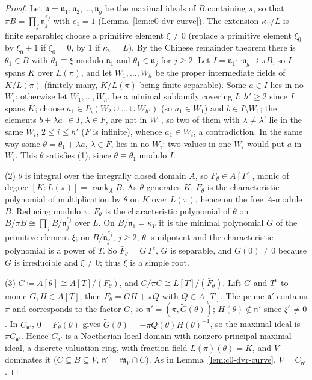 \begin{proof}
Let $\mathfrak n=\mathfrak n_1,\mathfrak n_2,\dots,\mathfrak n_g$ be the maximal ideals of $B$ containing $\pi$, so that $\pi B=\prod_j\mathfrak n_j^{e_j}$ with $e_1=1$
(Lemma~\ref{lem:c0-dvr-curve}). The extension $\kappa_V/L$ is finite separable; choose a primitive element $\xi\ne0$ (replace a
primitive element $\xi_0$ by $\xi_0+1$ if $\xi_0=0$, by $1$ if $\kappa_V=L$). By the Chinese remainder theorem there is $\theta_1\in B$ with
$\theta_1\equiv\xi$ modulo $\mathfrak n_1$ and $\theta_1\in\mathfrak n_j$ for $j\ge2$. Let $I=\mathfrak n_1\cdots\mathfrak n_g\supseteq\pi B$, so $I$ spans $K$ over $L(\pi)$,
and let $W_1,\dots,W_h$ be the proper intermediate fields of $K/L(\pi)$ (finitely many, $K/L(\pi)$ being finite separable).
Some $a\in I$ lies in no $W_i$: otherwise let $W_1,\dots,W_{h'}$ be a minimal subfamily covering $I$; $h'\ge2$ since $I$ spans
$K$; choose $a_1\in I\setminus(W_2\cup\dots\cup W_{h'})$ (so $a_1\in W_1$) and $b\in I\setminus W_1$; the elements $b+\lambda a_1\in I$, $\lambda\in F$, are not
in $W_1$, so two of them with $\lambda\ne\lambda'$ lie in the same $W_i$, $2\le i\le h'$ ($F$ is infinite), whence $a_1\in W_i$, a contradiction. In the same way some $\theta=\theta_1+\lambda a$, $\lambda\in F$, lies in no $W_i$: two values in one $W_i$ would put $a$
in $W_i$. This $\theta$ satisfies (1), since $\theta\equiv\theta_1$ modulo $I$.

(2) $\theta$ is integral over the integrally closed domain $A$, so $F_\theta\in A[T]$, monic of degree $[K:L(\pi)]=\operatorname{rank}_AB$. As $\theta$
generates $K$, $F_\theta$ is the characteristic polynomial of multiplication by $\theta$ on $K$ over $L(\pi)$, hence on the free $A$-module
$B$. Reducing modulo $\pi$, $\bar F_\theta$ is the characteristic polynomial of $\theta$ on $B/\pi B\cong\prod_jB/\mathfrak n_j^{e_j}$ over $L$. On
$B/\mathfrak n_1=\kappa_V$ it is the minimal polynomial $G$ of the primitive element $\xi$; on $B/\mathfrak n_j^{e_j}$, $j\ge2$, $\theta$ is nilpotent and the
characteristic polynomial is a power of $T$. So $\bar F_\theta=G\,T^{e}$, $G$ is separable, and $G(0)\ne0$ because $G$ is irreducible and
$\xi\ne0$; thus $\xi$ is a simple root.

(3) $C\coloneqq A[\theta]\cong A[T]/(F_\theta)$, and $C/\pi C\cong L[T]/(\bar F_\theta)$. Lift $G$ and $T^e$ to monic $\widetilde G,H\in A[T]$; then
$F_\theta=\widetilde GH+\pi Q$ with $Q\in A[T]$. The prime $\mathfrak n'$ contains $\pi$ and corresponds to the factor $G$, so
$\mathfrak n'=(\pi,\widetilde G(\theta))$; $H(\theta)\notin\mathfrak n'$ since $\xi^e\ne0$. In $C_{\mathfrak n'}$, $0=F_\theta(\theta)$ gives
$\widetilde G(\theta)=-\pi Q(\theta)H(\theta)^{-1}$, so the maximal ideal is $\pi C_{\mathfrak n'}$. Hence $C_{\mathfrak n'}$ is a Noetherian local domain with
nonzero principal maximal ideal, a discrete valuation ring, with fraction field $L(\pi)(\theta)=K$, and $V$ dominates it
($C\subseteq B\subseteq V$, $\mathfrak n'=\mathfrak m_V\cap C$). As in Lemma~\ref{lem:c0-dvr-curve}, $V=C_{\mathfrak n'}$.
\end{proof}

